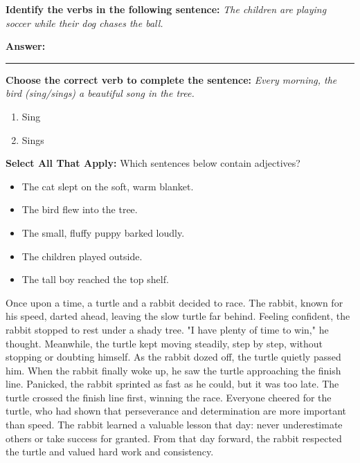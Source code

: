 \documentclass[12pt]{article}
\begin{document}
\begin{tcolorbox}[colframe=black!50, colback=white, title=Question 3]
\textbf{Identify the verbs in the following sentence:}  
\textit{The children are playing soccer while their dog chases the ball.}

\vspace{1cm}
\textbf{Answer:}
\rule{0.7\textwidth}{0.4mm}
\end{tcolorbox}

\begin{tcolorbox}[colframe=black!50, colback=white, title=Question 4]
\textbf{Choose the correct verb to complete the sentence:}  
\textit{Every morning, the bird (sing/sings) a beautiful song in the tree.}

\begin{enumerate}[label=(\Alph*)]
\item Sing
\item Sings
\end{enumerate}
\end{tcolorbox}

\begin{tcolorbox}[colframe=black!50, colback=white, title=Question 5]
\textbf{Select All That Apply:} Which sentences below contain adjectives?
\begin{itemize}
\item The cat slept on the soft, warm blanket.
\item The bird flew into the tree.
\item The small, fluffy puppy barked loudly.
\item The children played outside.
\item The tall boy reached the top shelf.
\end{itemize}
\end{tcolorbox}

\begin{tcolorbox}[colframe=black!50, colback=white, title=Story: The Turtle and the Rabbit]
Once upon a time, a turtle and a rabbit decided to race. The rabbit, known for his speed, darted ahead, leaving the slow turtle far behind. Feeling confident, the rabbit stopped to rest under a shady tree. "I have plenty of time to win," he thought. Meanwhile, the turtle kept moving steadily, step by step, without stopping or doubting himself. As the rabbit dozed off, the turtle quietly passed him. When the rabbit finally woke up, he saw the turtle approaching the finish line. Panicked, the rabbit sprinted as fast as he could, but it was too late. The turtle crossed the finish line first, winning the race. Everyone cheered for the turtle, who had shown that perseverance and determination are more important than speed. The rabbit learned a valuable lesson that day: never underestimate others or take success for granted. From that day forward, the rabbit respected the turtle and valued hard work and consistency.
\end{tcolorbox}
\end{document}
